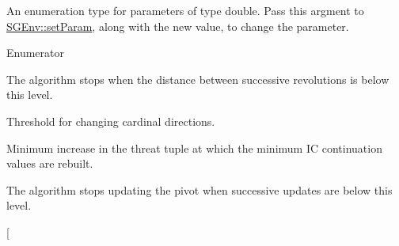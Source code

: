An enumeration type for parameters of type double. Pass this argment to \hyperlink{classSGEnv_a6edf7d4d2cdba8cba621420ff09d98ea}{S\-G\-Env\-::set\-Param}, along with the new value, to change the parameter. \begin{Desc}
\item[Enumerator]\par
\begin{description}
\item[{\em 
\hypertarget{classSGEnv_add4d052ff3e3d09a2113e0ebd032eba3a24f2422ce7913e83db351a70f25bc993}{E\-R\-R\-O\-R\-T\-O\-L}\label{classSGEnv_add4d052ff3e3d09a2113e0ebd032eba3a24f2422ce7913e83db351a70f25bc993}
}]The algorithm stops when the distance between successive revolutions is below this level. \item[{\em 
\hypertarget{classSGEnv_add4d052ff3e3d09a2113e0ebd032eba3a24c457dc76c36ab3523595cebeebe37c}{D\-I\-R\-E\-C\-T\-I\-O\-N\-T\-O\-L}\label{classSGEnv_add4d052ff3e3d09a2113e0ebd032eba3a24c457dc76c36ab3523595cebeebe37c}
}]Threshold for changing cardinal directions. \item[{\em 
\hypertarget{classSGEnv_add4d052ff3e3d09a2113e0ebd032eba3ae5078e3312adc27f56750570940bbc2a}{P\-A\-S\-T\-T\-H\-R\-E\-A\-T\-T\-O\-L}\label{classSGEnv_add4d052ff3e3d09a2113e0ebd032eba3ae5078e3312adc27f56750570940bbc2a}
}]Minimum increase in the threat tuple at which the minimum I\-C continuation values are rebuilt. \item[{\em 
\hypertarget{classSGEnv_add4d052ff3e3d09a2113e0ebd032eba3a57988c88be8abe2e0f5a70c24a0c6058}{U\-P\-D\-A\-T\-E\-P\-I\-V\-O\-T\-T\-O\-L}\label{classSGEnv_add4d052ff3e3d09a2113e0ebd032eba3a57988c88be8abe2e0f5a70c24a0c6058}
}]The algorithm stops updating the pivot when successive updates are below this level. \item[{\em 
}
\end{description}
\end{Desc}
